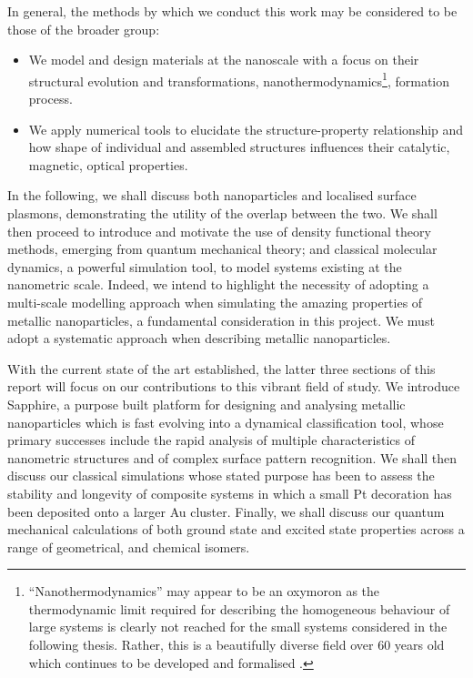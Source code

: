In general, the methods by which we conduct this work may be considered to be those of the broader group:

\begin{itemize}
    \item We model and design materials at the nanoscale with a focus on their structural evolution and transformations, nanothermodynamics\footnote{``Nanothermodynamics'' may appear to be an oxymoron as the thermodynamic limit required for describing the homogeneous behaviour of large systems is clearly not reached for the small systems considered in the following thesis. Rather, this is a beautifully diverse field over 60 years old \cite{10.1063/1.1732447} which continues to be developed and formalised \cite{e17010052,C4SC00052H}.}, formation process.

    \item We apply numerical tools to elucidate the structure-property relationship and how shape of individual and assembled structures influences their catalytic, magnetic, optical properties.
\end{itemize}


In the following, we shall discuss both nanoparticles and localised surface plasmons, demonstrating the utility of the overlap between the two. We shall then proceed to introduce and motivate the use of density functional theory methods, emerging from quantum mechanical theory; and classical molecular dynamics, a powerful simulation tool, to model systems existing at the nanometric scale. Indeed, we intend to highlight the necessity of adopting a multi-scale modelling approach when  simulating the amazing properties of metallic nanoparticles, a fundamental consideration in this project. We must adopt a systematic approach when describing metallic nanoparticles. 

With the current state of the art established, the latter three sections of this report will focus on our contributions to this vibrant field of study. We introduce Sapphire, a purpose built platform for designing and analysing metallic nanoparticles which is fast evolving into a dynamical classification tool, whose primary successes include the rapid analysis of multiple characteristics of nanometric structures and of complex surface pattern recognition. We shall then discuss our classical simulations whose stated purpose has been to assess the stability and longevity of composite systems in which a small Pt decoration has been deposited onto a larger Au cluster. Finally, we shall discuss our quantum mechanical calculations of both ground state and excited state properties across a range of geometrical, and chemical isomers. 

